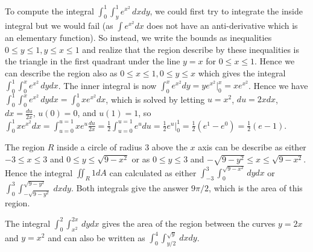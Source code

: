 \begin{example}
To compute the integral $\int_0^1\int_y^1
e^{x^2}\,dxdy$, we could first try to integrate the inside integral but
we would fail (as $\int e^{x^2}dx$ does not have an anti-derivative which
is an elementary function). So instead, we write the bounds as
inequalities $0\leq y\leq 1, y\leq x\leq 1$ and realize that the region describe
by these inequalities is the triangle in the first quadrant under the
line $y=x$ for $0\leq x\leq 1$.  Hence we can describe the region also as
$0\leq x\leq 1, 0\leq y\leq x$ which gives the integral $\int_0^1\int_0^x e^{x^2}\,dydx$.
The inner integral is now $\int_0^x e^{x^2}dy = ye^{x^2}\big|_0^x =
xe^{x^2}$.  Hence we have $\int_0^1\int_0^x e^{x^2}\,dydx = \int_0^1 xe^{x^2}dx$,
which is solved by letting $u=x^2$, $du=2xdx$, $dx=\frac{du}{2x}$,
$u(0)=0$, and $u(1)=1$, so $\int_0^1 xe^{x^2}dx = \int_{u=0}^{u=1} x
e^{u}\frac{du}{2x} =  \frac{1}{2}\int_{u=0}^{u=1} e^{u}du =
\frac{1}{2}e^u\big|_0^1 = \frac{1}{2}(e^1-e^0) = \frac{1}{2}(e-1)$.
\end{example}

\begin{example}
The region $R$ inside a circle of radius 3 above the $x$ axis can be
describe as either $-3\leq x\leq 3$ and $0\leq y\leq \sqrt{9-x^2}$ or as $0\leq y\leq 3$ and
$-\sqrt{9-y^2}\leq x\leq \sqrt{9-x^2}$.  Hence the integral $\iint_R  1 dA$
can calculated as either $\int_{-3}^{3}\int_{0}^{\sqrt{9-x^2}}dydx$ or
$\int_{0}^{3}\int_{-\sqrt{9-y^2}}^{\sqrt{9-y^2}}\,dxdy$.  Both integrals give
the answer $9\pi/2$, which is the area of this region.  
\end{example}

\begin{example}\label{ex:double-integral}
The integral $\int_0^2\int_{x^2}^{2x}\,dydx$ gives the area of the region
between the curves $y=2x$ and $y=x^2$ and can also be written as
$\int_0^4\int_{y/2}^{\sqrt{y}}\,dxdy$.
%
\end{example}




